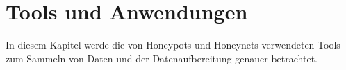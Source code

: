 \chapter{Tools und Anwendungen}
In diesem Kapitel werde die von Honeypots und Honeynets verwendeten Tools zum Sammeln von Daten und der Datenaufbereitung genauer betrachtet.



